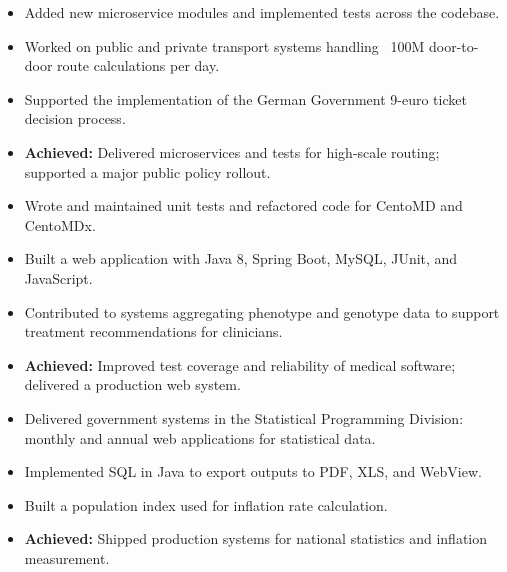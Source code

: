 \documentclass[10pt,a4paper]{altacv}
\begin{document}
\divider
\newpage
{}
\begin{itemize}
    \item Added new microservice modules and implemented tests across the codebase.
    \item Worked on public and private transport systems handling ~100M door-to-door route calculations per day.
    \item Supported the implementation of the German Government 9-euro ticket decision process.
    \item \textbf{Achieved:} Delivered microservices and tests for high-scale routing; supported a major public policy rollout.
\end{itemize}

\divider
{}
\begin{itemize}
    \item Wrote and maintained unit tests and refactored code for CentoMD and CentoMDx.
    \item Built a web application with Java 8, Spring Boot, MySQL, JUnit, and JavaScript.
    \item Contributed to systems aggregating phenotype and genotype data to support treatment recommendations for clinicians.
    \item \textbf{Achieved:} Improved test coverage and reliability of medical software; delivered a production web system.
\end{itemize}

\divider
{}
\begin{itemize}
    \item Delivered government systems in the Statistical Programming Division: monthly and annual web applications for statistical data.
    \item Implemented SQL in Java to export outputs to PDF, XLS, and WebView.
    \item Built a population index used for inflation rate calculation.
    \item \textbf{Achieved:} Shipped production systems for national statistics and inflation measurement.
\end{itemize}
\end{document}
